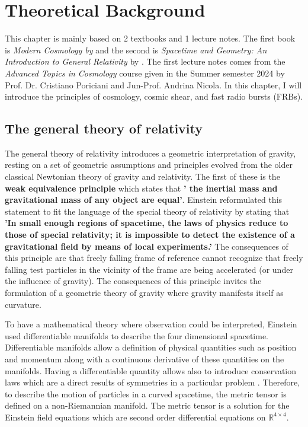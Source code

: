 \chapter{Theoretical Background} \label{chap:theory}

This chapter is mainly based on 2 textbooks and 1 lecture notes. The first book is \textit{Modern Cosmology by} \citet{Dodelson_Schmidt_2026} and the second is \textit{Spacetime and Geometry: An Introduction to General Relativity} by \citet{Carroll_2024}. The first lecture notes comes from the \textit{Advanced Topics in Cosmology} course given in the Summer semester 2024 by Prof. Dr. Cristiano Poriciani and Jun-Prof. Andrina Nicola. In this chapter, I will introduce the principles of cosmology, cosmic shear, and fast radio bursts (FRBs).



\section{The general theory of relativity}\label{theory_sec:GR}
The general theory of relativity introduces a geometric interpretation of gravity, resting on a set of geometric assumptions and principles evolved from the older classical Newtonian theory of gravity and relativity. The first of these is the \textbf{weak equivalence principle} which states that \textbf{' the inertial mass and gravitational mass of any object are equal'}. Einstein reformulated this statement to fit the language of the special theory of relativity by stating that \textbf{'In small enough regions of spacetime, the laws of physics reduce to those of special relativity; it is impossible to detect the existence of a gravitational field by means of local experiments.'} The consequences of this principle are that freely falling frame of reference cannot recognize that freely falling test particles in the vicinity of the frame are being accelerated (or under the influence of gravity). The consequences of this principle invites the formulation of a geometric theory of gravity where gravity manifests itself as curvature. 

To have a mathematical theory where observation could be interpreted, Einstein used differentiable manifolds to describe the four dimensional spacetime. Differentiable manifolds allow a definition of physical quantities such as position and momentum along with a continuous derivative of these quantities on the manifolds. Having a differentiable quantity allows also to introduce conservation laws which are a direct results of symmetries in a particular problem \citep{Noether_1983}. Therefore, to describe the motion of particles in a curved spacetime, the metric tensor is defined on a non-Riemannian manifold. The metric tensor is a solution for the Einstein field equations which are second order differential equations on $\mathbb{R}^{4\times4}$. 

